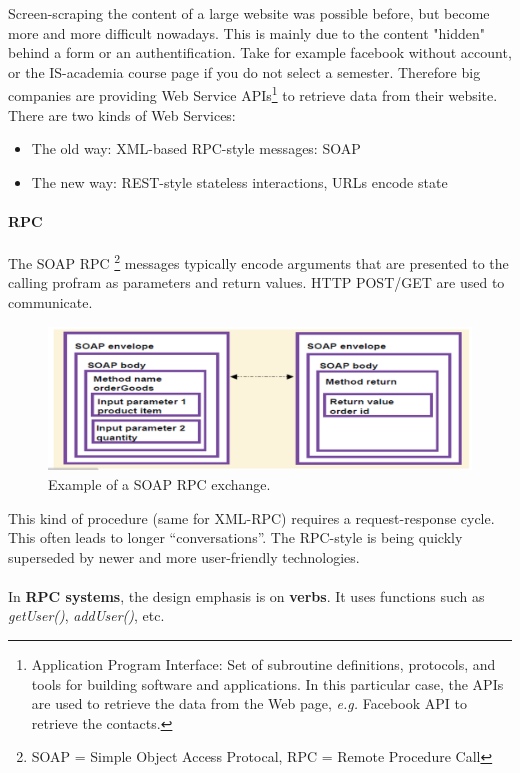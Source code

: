 \documentclass[a4paper,11pt,twoside]{article}
\begin{document}
Screen-scraping the content of a large website was possible before, but become more and more difficult nowadays. This is mainly due to the content "hidden" behind a form or an authentification. Take for example facebook without account, or the IS-academia course page if you do not select a semester. Therefore big companies are providing Web Service APIs\footnote{Application Program Interface: Set of subroutine definitions, protocols, and tools for building software and applications. In this particular case, the APIs are used to retrieve the data from the Web page, {\it e.g.} Facebook API to retrieve the contacts.} to retrieve data from their website. There are two kinds of Web Services:
\begin{itemize}
 \item The old way: XML-based RPC-style messages: SOAP
 \item The new way: REST-style stateless interactions, URLs encode state
\end{itemize}

\paragraph{RPC}

The SOAP RPC \footnote{SOAP = Simple Object Access Protocal, RPC = Remote Procedure Call} messages typically encode arguments that are presented to the calling profram as parameters and return values. HTTP POST/GET are used to communicate.
\begin{figure}[H]%
 \centering
 \includegraphics[width=13cm]{./pic/soap-rpc}
 \caption{\label{pic:soap-rpc} Example of a SOAP RPC exchange.}
\end{figure}
This kind of procedure (same for XML-RPC) requires a request-response cycle. This often leads to longer ``conversations''. The RPC-style is being quickly superseded by newer and more user-friendly technologies.\\\\
In {\bf RPC systems}, the design emphasis is on {\bf verbs}. It uses functions such as {\it getUser()}, {\it addUser()}, etc.
\end{document}
